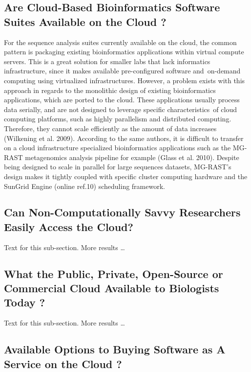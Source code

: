 \documentclass[10pt]{bmc_article}
\newenvironment{bmcformat}{\begin{raggedright}\baselineskip20pt\sloppy\setboolean{publ}{false}}{\end{raggedright}\baselineskip20pt\sloppy}
\begin{document}
\begin{bmcformat}
  \subsection*{Are Cloud-Based Bioinformatics Software Suites Available on the Cloud ?}

      For the sequence analysis suites currently available on the cloud, the common pattern is
      packaging existing bioinformatics applications within virtual compute servers. This is a
      great solution for smaller labs that lack informatics infrastructure, since it makes
      available pre-configured software and on-demand computing using virtualized
      infrastructures. However, a problem exists with this approach in regards to the monolithic
      design of existing bioinformatics applications, which are ported to the cloud. These
      applications usually process data serially, and are not designed to leverage specific
      characteristics of cloud computing platforms, such as highly parallelism and distributed
      computing. Therefore, they cannot scale efficiently as the amount of data increases
      (Wilkening et al. 2009). According to the same authors, it is difficult to transfer on a
      cloud infrastructure specialized bioinformatics applications such as the MG-RAST
      metagenomics analysis pipeline for example (Glass et al. 2010). Despite being designed to
      scale in parallel for large sequences datasets, MG-RAST's design makes it tightly coupled
      with specific cluster computing hardware and the SunGrid Engine (online ref.10) scheduling
      framework.

  \subsection*{Can Non-Computationally Savvy Researchers Easily Access the Cloud?}
    Text for this sub-section.  More results \ldots
  
  \subsection*{What the Public, Private, Open-Source or Commercial Cloud Available to Biologists Today ?}
    Text for this sub-section.  More results \ldots
  
  \subsection*{Available Options to Buying Software as A Service on the Cloud ?}


\end{bmcformat}
\end{document}
